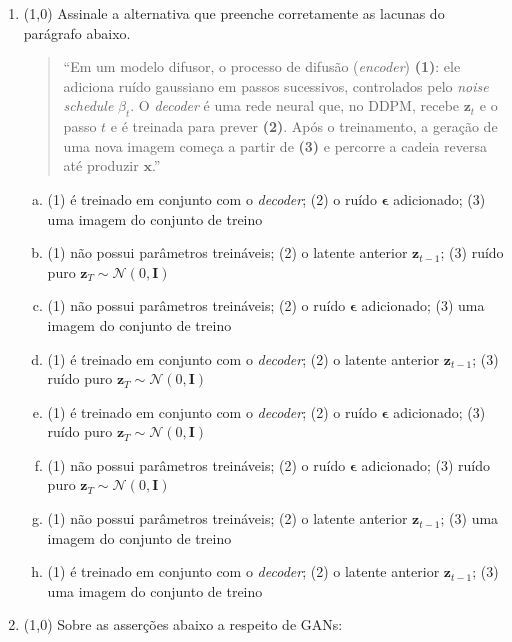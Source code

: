 \documentclass[11pt,a4paper]{article}
\begin{document}
\begin{enumerate}[1)]
\pagebreak
\item (1{,}0) Assinale a alternativa que preenche corretamente as lacunas do parágrafo abaixo.

\begin{quote}
``Em um modelo difusor, o processo de difusão (\textit{encoder}) \textbf{(1)}: ele adiciona ruído gaussiano em passos sucessivos, controlados pelo \textit{noise schedule} $\beta_t$. O \textit{decoder} é uma rede neural que, no DDPM, recebe $\mathbf{z}_t$ e o passo $t$ e é treinada para prever \textbf{(2)}. Após o treinamento, a geração de uma nova imagem começa a partir de \textbf{(3)} e percorre a cadeia reversa até produzir $\mathbf{x}$.''
\end{quote}

\begin{enumerate}[a)]
    \item (1) é treinado em conjunto com o \textit{decoder}; (2) o ruído $\boldsymbol{\epsilon}$ adicionado; (3) uma imagem do conjunto de treino
    \item (1) não possui parâmetros treináveis; (2) o latente anterior $\mathbf{z}_{t-1}$; (3) ruído puro $\mathbf{z}_T \sim \mathcal{N}(0, \mathbf{I})$
    \item (1) não possui parâmetros treináveis; (2) o ruído $\boldsymbol{\epsilon}$ adicionado; (3) uma imagem do conjunto de treino
    \item (1) é treinado em conjunto com o \textit{decoder}; (2) o latente anterior $\mathbf{z}_{t-1}$; (3) ruído puro $\mathbf{z}_T \sim \mathcal{N}(0, \mathbf{I})$
    \item (1) é treinado em conjunto com o \textit{decoder}; (2) o ruído $\boldsymbol{\epsilon}$ adicionado; (3) ruído puro $\mathbf{z}_T \sim \mathcal{N}(0, \mathbf{I})$
    \item (1) não possui parâmetros treináveis; (2) o ruído $\boldsymbol{\epsilon}$ adicionado; (3) ruído puro $\mathbf{z}_T \sim \mathcal{N}(0, \mathbf{I})$
    \item (1) não possui parâmetros treináveis; (2) o latente anterior $\mathbf{z}_{t-1}$; (3) uma imagem do conjunto de treino
    \item (1) é treinado em conjunto com o \textit{decoder}; (2) o latente anterior $\mathbf{z}_{t-1}$; (3) uma imagem do conjunto de treino
\end{enumerate}

\item (1{,}0) Sobre as asserções abaixo a respeito de GANs:


\end{enumerate}
\end{document}
